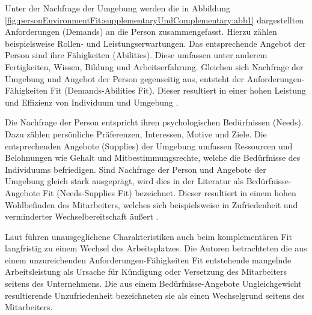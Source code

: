 Unter der Nachfrage der Umgebung werden die in Abbildung \ref{fig:personEnvironmentFit:supplementaryUndComplementary:abb1} dargestellten Anforderungen (Demands) an die Person zusammengefasst. Hierzu zählen beispielsweise Rollen- und Leistungserwartungen. Das entsprechende Angebot der Person sind ihre Fähigkeiten (Abilities). Diese umfassen unter anderem Fertigkeiten, Wissen, Bildung und Arbeitserfahrung. Gleichen sich Nachfrage der Umgebung und Angebot der Person gegenseitig aus, entsteht der Anforderungen-Fähigkeiten Fit (Demands-Abilities Fit). Dieser resultiert in einer hohen Leistung und Effizienz von Individuum und Umgebung \cite[S. 3f.]{edwards:1991}\cite[S. 5]{edwards:1996}\cite[S. 4f.]{edwards:2007}\cite[S. 6]{su:2015}.

Die Nachfrage der Person entspricht ihren psychologischen Bedürfnissen (Needs). Dazu zählen persönliche Präferenzen, Interessen, Motive und Ziele. Die entsprechenden Angebote (Supplies) der Umgebung umfassen Ressourcen und Belohnungen wie Gehalt und Mitbestimmungsrechte, welche die Bedürfnisse des Individuums befriedigen. Sind Nachfrage der Person und Angebote der Umgebung gleich stark ausgeprägt, wird dies in der Literatur als Bedürfnisse-Angebote Fit (Needs-Supplies Fit) bezeichnet. Dieser resultiert in einem hohen Wohlbefinden des Mitarbeiters, welches sich beispielsweise in Zufriedenheit und verminderter Wechselbereitschaft äußert \cite[S. 2]{edwards:2004}\cite[S. 2f.]{edwards:1996}\cite[S. 4]{edwards:2008}\cite[S. 4f.]{edwards:2007}\cite[S. 6]{su:2015}.

Laut \textcite[S. 9ff.]{workAdjustment:1964} führen unausgeglichene Charakteristiken auch beim komplementären Fit langfristig zu einem Wechsel des Arbeitsplatzes. Die Autoren betrachteten die aus einem unzureichenden Anforderungen-Fähigkeiten Fit entstehende mangelnde Arbeitsleistung als Ursache für Kündigung oder Versetzung des Mitarbeiters seitens des Unternehmens. Die aus einem Bedürfnisse-Angebote Ungleichgewicht resultierende Unzufriedenheit bezeichneten sie als einen Wechselgrund seitens des Mitarbeiters.

